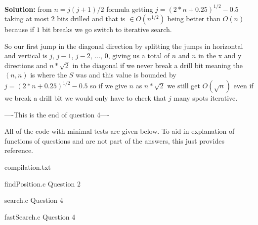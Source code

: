 \documentclass[a4,13pt]{extarticle}
\newenvironment{Solution}{\color{blue}\textbf{Solution:}}{}
\begin{document}
\begin{enumerate}
\begin{enumerate}
\begin{Solution}
	      	from $n=j(j+1)/2$ formula getting $j=(2*n+0.25)^{1/2}-0.5$ taking at most $2$ bits drilled and that is $\in O(n^{1/2})$ being better than $O(n)$ because if $1$ bit breaks we go switch to iterative search.
	      	
	      	So our first jump in the diagonal direction by splitting the jumps in horizontal and vertical is $j$, $j-1$, $j-2$, ..., $0$, giving us a total of $n$ and $n$ in the x and y directions and $n*\sqrt{2}$ in the diagonal if we never break a drill bit meaning the $(n,n)$ is where the $S$ was and this value is bounded by $j=(2*n+0.25)^{1/2}-0.5$ so if we give $n$ as $n*\sqrt{2}$ we still get $O(\sqrt{n})$ even if we break a drill bit we would only have to check that $j$ many spots iterative.
	      	\newpage    
                
	      	\end{Solution}
	      	      	      	              
	      \end{enumerate}
	      	              
	      	              
	      \newpage 

	      	          
\end{enumerate}
----This is the end of question 4----


All of the code with minimal tests are given below. To aid in explanation of functions of questions and are not part of the answers, this just provides reference.

compilation.txt

findPosition.c Question 2

search.c Question 4

fastSearch.c Question 4

\end{document}
